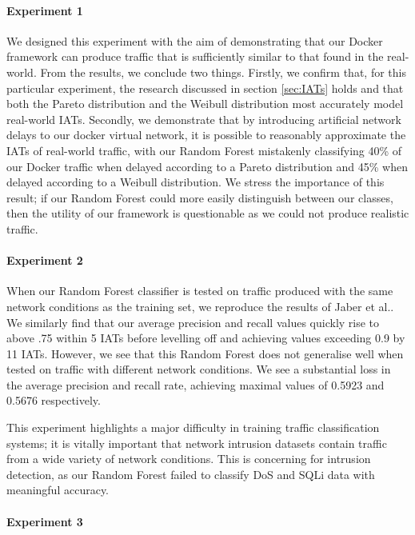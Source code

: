 \documentclass[msc,deptreport, cs]{infthesis} %
\begin{document}
\paragraph*{Experiment 1} We designed this experiment with the aim of demonstrating that our Docker framework can produce traffic that is sufficiently similar to that found in the real-world. From the results, we conclude two things. Firstly, we confirm that, for this particular experiment, the research discussed in section \ref{sec:IATs} holds and that both the Pareto distribution and the Weibull distribution most accurately model real-world IATs. Secondly, we demonstrate that by introducing artificial network delays to our docker virtual network, it is possible to reasonably approximate the IATs of real-world traffic, with our Random Forest mistakenly classifying 40\% of our Docker traffic when delayed according to a Pareto distribution and 45\% when delayed according to a Weibull distribution. We stress the importance of this result; if our Random Forest could more easily distinguish between our classes, then the utility of our framework is questionable as we could not produce realistic traffic.

\paragraph*{Experiment 2} When our Random Forest classifier is tested on traffic produced with the same network conditions as the training set, we reproduce the results of Jaber et al.\cite{jaber2011can}. We similarly find that our average precision and recall values quickly rise to above .75 within 5 IATs before levelling off and achieving values exceeding 0.9 by 11 IATs. However, we see that this Random Forest does not generalise well when tested on traffic with different network conditions. We see a substantial loss in the average precision and recall rate, achieving maximal values of 0.5923 and 0.5676 respectively.

This experiment highlights a major difficulty in training traffic classification systems; it is vitally important that network intrusion datasets contain traffic from a wide variety of network conditions. This is concerning for intrusion detection, as our Random Forest failed to classify DoS and SQLi data with meaningful accuracy.


\paragraph*{Experiment 3}
\end{document}

